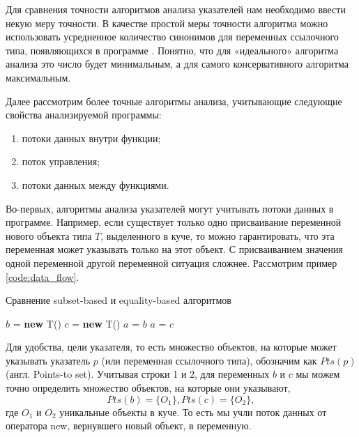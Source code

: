 \documentclass[14pt,titlepage]{extarticle}
\newcommand{\NEW}{\textbf{new }}
\newcommand{\eng}[1]{{\English#1}}
\begin{document}
      Для сравнения точности алгоритмов анализа указателей нам необходимо ввести
      некую меру точности. В качестве простой меры точности алгоритма можно
      использовать усредненное количество синонимов для переменных ссылочного
      типа, появляющихся в программе \cite{hind_pointer_analysis_not_solved_yet}.
      Понятно, что для «идеального» алгоритма анализа это число будет
      минимальным, а для самого консервативного алгоритма максимальным.

      Далее рассмотрим более точные алгоритмы анализа, учитывающие следующие
      свойства анализируемой программы:
      \begin{enumerate}
        \item потоки данных внутри функции;
        \item поток управления;
        \item потоки данных между функциями.
      \end{enumerate}

      Во-первых, алгоритмы анализа указателей могут учитывать потоки данных в
      программе.
      Например, если существует только одно присваивание переменной нового
      объекта типа $T$, выделенного в куче, то можно гарантировать, что эта
      переменная может указывать только на этот объект.
      С присваиванием значения одной переменной другой переменной ситуация
      сложнее. Рассмотрим пример \ref{code:data_flow}.
      \begin{algorithm}
        \caption{Сравнение \eng{subset-based} и \eng{equality-based} алгоритмов}
        \label{code:data_flow}
        \begin{algorithmic}[1]
          \STATE $b$ = \NEW T()
          \STATE $c$ = \NEW T()
          \STATE $a$ = $b$
          \STATE $a$ = $c$
        \end{algorithmic}
      \end{algorithm}
      Для удобства, цели указателя, то есть множество объектов, на которые может
      указывать указатель $p$ (или переменная ссылочного типа), обозначим как
      $Pts(p)$ (англ. \eng{Points-to set}).
      Учитывая строки 1 и 2, для переменных $b$ и $c$ мы можем точно определить
      множество объектов, на которые они указывают,
      \[Pts(b) = \{O_1\}, Pts(c) = \{O_2\},\] где $O_1$ и $O_2$ уникальные
      объекты в куче. То есть мы учли поток данных от оператора new,
      вернувшего новый объект, в переменную.
\end{document}
